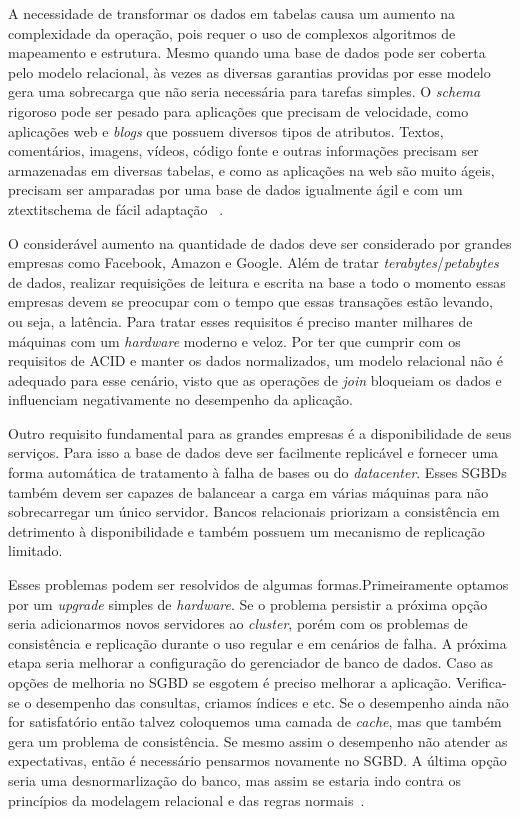 A necessidade de transformar os dados em tabelas causa um aumento na complexidade da operação, pois requer o uso de complexos algoritmos de mapeamento e estrutura. Mesmo quando uma base de dados pode ser coberta pelo modelo relacional, às vezes as diversas garantias providas por esse modelo gera uma sobrecarga que não seria necessária para tarefas simples. O \textit{schema} rigoroso pode ser pesado para aplicações que precisam de velocidade, como aplicações web e \textit{blogs} que possuem diversos tipos de atributos. Textos, comentários, imagens, vídeos, código fonte e outras informações precisam ser armazenadas em diversas tabelas, e como as aplicações na web são muito ágeis, precisam ser amparadas por uma base de dados igualmente ágil e com um ztextit{schema} de fácil adaptação ~\cite{nosqlevaluation}.

O considerável aumento na quantidade de dados deve ser considerado por grandes empresas como Facebook, Amazon e Google. Além de tratar \textit{terabytes}/\textit{petabytes} de dados, realizar requisições de leitura e escrita na base a todo o momento essas empresas devem se preocupar com o tempo que essas transações estão levando, ou seja, a latência. Para tratar esses requisitos é preciso manter milhares de máquinas com um \textit{hardware} moderno e veloz. Por ter que cumprir com os requisitos de ACID e manter os dados normalizados, um modelo relacional não é adequado para esse cenário, visto que as operações de \textit{join} bloqueiam os dados e influenciam negativamente no desempenho da aplicação.

Outro requisito fundamental para as grandes empresas é a disponibilidade de seus serviços. Para isso a base de dados deve ser facilmente replicável e fornecer uma forma automática de tratamento à falha de bases ou do \textit{datacenter}. Esses SGBDs também devem ser capazes de balancear a carga em várias máquinas para não sobrecarregar um único servidor. Bancos relacionais priorizam a consistência em detrimento à disponibilidade e também possuem um mecanismo de replicação limitado.

Esses problemas podem ser resolvidos de algumas formas.Primeiramente optamos por um \textit{upgrade} simples de \textit{hardware}. Se o problema persistir a próxima opção seria adicionarmos novos servidores ao \textit{cluster}, porém com os problemas de consistência e replicação durante o uso regular e em cenários de falha. A próxima etapa seria melhorar a configuração do gerenciador de banco de dados. Caso as opções de melhoria no SGBD se esgotem é preciso melhorar a aplicação. Verifica-se o desempenho das consultas, criamos índices e etc. Se o desempenho ainda não for satisfatório então talvez coloquemos uma camada de \textit{cache}, mas que também gera um problema de consistência. Se mesmo assim o desempenho não atender as expectativas, então é necessário pensarmos novamente no SGBD. A última opção seria uma desnormarlização do banco, mas assim se estaria indo contra os princípios da modelagem relacional e das regras normais~\cite{cassandraguide}.

